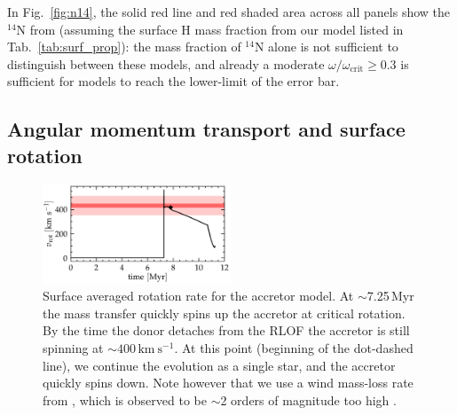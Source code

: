 \documentclass[twocolumn,twocolappendix,trackchanges]{aastex63}
\newcommand{\kms}{{\mathrm{km\ s^{-1}}}}
\DeclareRobustCommand{\Figref}[1]{Fig.~\ref{#1}}
\DeclareRobustCommand{\Tabref}[1]{Tab.~\ref{#1}}
\begin{document}
In \Figref{fig:n14}, the solid red line and red shaded area across all panels show the
$^{14}\mathrm{N}$ from  (assuming the
surface H mass fraction from our model listed in \Tabref{tab:surf_prop}): the mass fraction of $^{14}\mathrm{N}$
alone is not sufficient to distinguish between these models, and already
a moderate $\omega/\omega_\mathrm{crit}\geq0.3$ is sufficient for
models to reach the lower-limit of the error bar.


\subsection{Angular momentum transport and surface rotation}
\label{sec:rot}

\begin{figure}[htbp]
  \includegraphics[width=0.5\textwidth]{zeta_rot}
  \caption{Surface averaged rotation rate for the accretor
    model. At $\sim$7.25\,Myr the mass transfer quickly spins
    up the accretor at critical rotation. By the time the donor
    detaches from the RLOF the accretor is still spinning at
    $\sim$$400\,\kms$. At this point (beginning of the dot-dashed line), we continue the evolution as a single star, and the accretor quickly spins down. Note however that we use a wind mass-loss rate from \cite{vink:01}, which is observed to be
    $\sim$2 orders of magnitude too high \citep{marcolino:09}.}
  \label{fig:surf_rot}
\end{figure}
\end{document}
